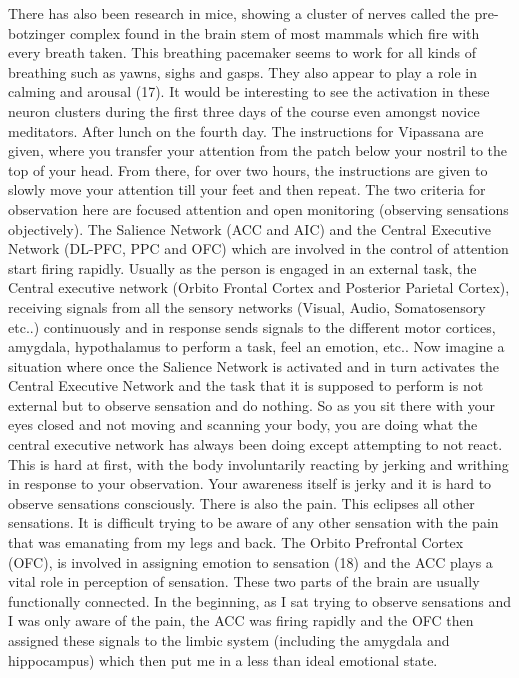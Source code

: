 \documentclass[twocolumn]{article}
\begin{document}
There has also been research in mice, showing a cluster of nerves called the pre-botzinger complex found in the brain stem of most mammals which fire with every breath taken. This breathing pacemaker seems to work for all kinds of breathing such as yawns, sighs and gasps. They also appear to play a role in calming and arousal (17). It would be interesting to see the activation in these neuron clusters during the first three days of the course even amongst novice meditators.
After lunch on the fourth day. The instructions for Vipassana are given, where you transfer your attention from the patch below your nostril to the top of your head. From there, for over two hours, the instructions are given to slowly move your attention till your feet and then repeat. The two criteria for observation here are focused attention and open monitoring (observing sensations objectively).
The Salience Network (ACC and AIC) and the Central Executive Network (DL-PFC, PPC and OFC) which are involved in the control of attention start firing rapidly. Usually as the person is engaged in an external task, the Central executive network (Orbito Frontal Cortex and Posterior Parietal Cortex), receiving signals from all the sensory networks (Visual, Audio, Somatosensory etc..) continuously and in response sends signals to the different motor cortices, amygdala, hypothalamus to perform a task, feel an emotion, etc..
Now imagine a situation where once the Salience Network is activated and in turn activates the Central Executive Network and the task that it is supposed to perform is not external but to observe sensation and do nothing. So as you sit there with your eyes closed and not moving and scanning your body, you are doing what the central executive network has always been doing except attempting to not react.
This is hard at first, with the body involuntarily reacting by jerking and writhing in response to your observation. Your awareness itself is jerky and it is hard to observe sensations consciously.
There is also the pain. This eclipses all other sensations. It is difficult trying to be aware of any other sensation with the pain that was emanating from my legs and back. The Orbito Prefrontal Cortex (OFC), is involved in assigning emotion to sensation (18) and the ACC plays a vital role in perception of sensation. These two parts of the brain are usually functionally connected. In the beginning, as I sat trying to observe sensations and I was only aware of the pain, the ACC was firing rapidly and the OFC then assigned these signals to the limbic system (including the amygdala and hippocampus) which then put me in a less than ideal emotional state.
\end{document}
